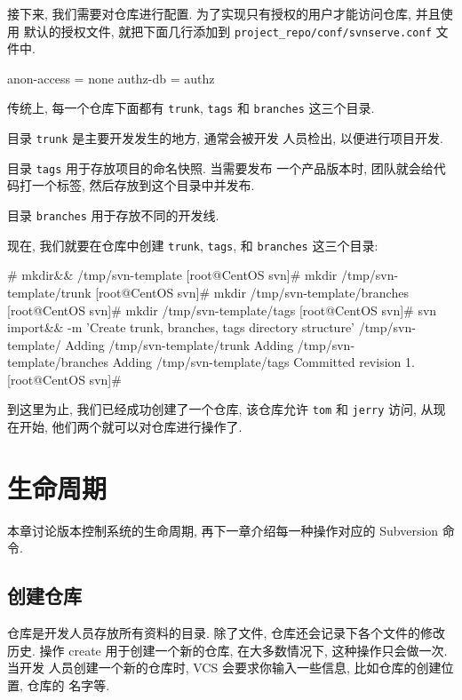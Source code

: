 \documentclass[nofonts, oneside]{ctexbook}
\newcommand\svn{\texttt{svn}}
\begin{document}
接下来, 我们需要对仓库进行配置. 为了实现只有授权的用户才能访问仓库, 并且使用
默认的授权文件, 就把下面几行添加到
\texttt{project\_repo/conf/svnserve.conf}
文件中.
\begin{svnshell}
anon-access = none
authz-db = authz
\end{svnshell}

传统上, 每一个仓库下面都有 \texttt{trunk}, \texttt{tags} 和 \texttt{branches}
这三个目录.

目录 \texttt{trunk} 是主要开发发生的地方, 通常会被开发
人员检出, 以便进行项目开发.

目录 \texttt{tags} 用于存放项目的命名快照. 当需要发布
一个产品版本时, 团队就会给代码打一个标签, 然后存放到这个目录中并发布.

目录 \texttt{branches} 用于存放不同的开发线.

现在, 我们就要在仓库中创建 \texttt{trunk}, \texttt{tags}, 和 \texttt{branches}
这三个目录:
\begin{svnshell}
# mkdir&& /tmp/svn-template
[root@CentOS svn]# mkdir /tmp/svn-template/trunk
[root@CentOS svn]# mkdir /tmp/svn-template/branches
[root@CentOS svn]# mkdir /tmp/svn-template/tags
[root@CentOS svn]# svn import&\index{\svn!\texttt{import}}& -m 'Create trunk, branches, tags directory structure' /tmp/svn-template/
Adding              /tmp/svn-template/trunk
Adding              /tmp/svn-template/branches
Adding              /tmp/svn-template/tags
Committed revision 1.
[root@CentOS svn]#
\end{svnshell}

到这里为止, 我们已经成功创建了一个仓库, 该仓库允许 \texttt{tom} 和
\texttt{jerry} 访问, 从现在开始, 他们两个就可以对仓库进行操作了.

\chapter{生命周期}
\label{chap:life_cycle}

本章讨论版本控制系统的生命周期, 再下一章介绍每一种操作对应的 Subversion 命令.

\section{创建仓库}
\label{sec:create_repository}

仓库是开发人员存放所有资料的目录. 除了文件, 仓库还会记录下各个文件的修改历史.
操作 create 用于创建一个新的仓库, 在大多数情况下, 这种操作只会做一次. 当开发
人员创建一个新的仓库时, VCS 会要求你输入一些信息, 比如仓库的创建位置, 仓库的
名字等.
\end{document}
